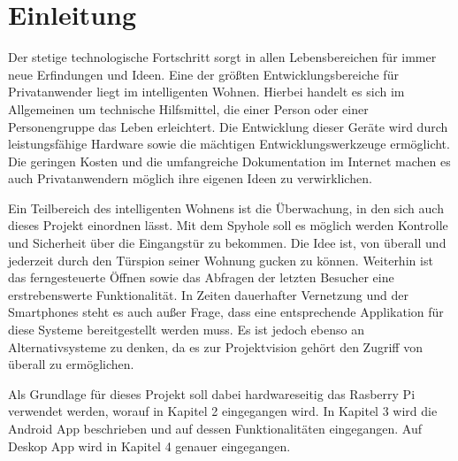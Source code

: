 
\chapter{Einleitung}
Der stetige technologische Fortschritt sorgt in allen Lebensbereichen für immer neue Erfindungen und Ideen. Eine der größten Entwicklungsbereiche für Privatanwender liegt im intelligenten Wohnen. Hierbei handelt es sich im Allgemeinen um technische Hilfsmittel, die einer Person oder einer Personengruppe das Leben erleichtert. Die Entwicklung dieser Geräte wird durch leistungsfähige Hardware sowie die mächtigen Entwicklungswerkzeuge ermöglicht. Die geringen Kosten und die umfangreiche Dokumentation im Internet machen es auch Privatanwendern möglich ihre eigenen Ideen zu verwirklichen.  
\par
Ein Teilbereich des intelligenten Wohnens ist die Überwachung, in den sich auch dieses Projekt einordnen lässt. Mit dem Spyhole soll es möglich werden Kontrolle und Sicherheit über die Eingangstür zu bekommen. Die Idee ist, von überall und jederzeit durch den Türspion seiner Wohnung gucken zu können. Weiterhin ist das ferngesteuerte Öffnen sowie das Abfragen der letzten Besucher eine erstrebenswerte Funktionalität. In Zeiten dauerhafter Vernetzung und der Smartphones steht es auch außer Frage, dass eine entsprechende Applikation für diese Systeme bereitgestellt werden muss. Es ist jedoch ebenso an Alternativsysteme zu denken, da es zur Projektvision gehört den Zugriff von überall zu ermöglichen. 
\par
Als Grundlage für dieses Projekt soll dabei hardwareseitig das Rasberry Pi verwendet werden, worauf in Kapitel 2 eingegangen wird. In Kapitel 3 wird die Android App beschrieben und auf dessen Funktionalitäten eingegangen. Auf Deskop App wird in Kapitel 4 genauer eingegangen.